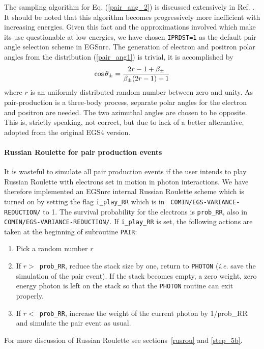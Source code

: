 The sampling algorithm for Eq. (\ref{pair_ang_2}) is discussed
extensively in Ref. \cite{Bi91}.
It should be noted that
this algorithm becomes progressively more inefficient with
increasing energies. Given this fact and the approximations
involved which make its use questionable at low energies,
we have chosen {\tt IPRDST=1} as the default
pair angle selection scheme in EGSnrc. The generation
of electron and positron polar angles from the
distribution (\ref{pair_ang1}) is trivial, it
is accomplished by
\begin{equation}
\cos \theta_\pm = {2 r - 1 + \beta_\pm \over \beta_\pm (2 r -1 ) + 1}
\end{equation}
where $r$ is an uniformly distributed random number between zero and
unity. As pair-production is a three-body process, separate polar
angles for the electron and positron are needed. The two
azimuthal angles are chosen to be opposite. This is,
strictly speaking, not correct, but due to lack of a better
alternative, adopted from the original EGS4 version.

\paragraph{Russian Roulette for pair production events} \hfill
{}

It is wasteful to simulate all pair production events if
the user intends to play Russian Roulette with electrons
set in motion in photon interactions. We have therefore implemented
an EGSnrc internal Russian Roulette scheme which is turned on
by setting the flag {\tt i\_play\_RR} which is in {\tt
COMIN/EGS-VARIANCE-REDUCTION/}
to 1. The survival probability for the electrons is
{\tt prob\_RR}, also in {\tt COMIN/EGS-VARIANCE-REDUCTION/}.
If {\tt i\_play\_RR} is set, the following actions are
taken at the beginning of subroutine {\tt PAIR}:
 
\begin{enumerate}
\item
Pick a random number $r$
\item
If $r > $~{\tt prob\_RR}, reduce the stack size by one, return
to {\tt PHOTON} ({\em i.e.} save the simulation of the pair event).
If the stack becomes empty, a zero weight, zero energy photon
is left on the stack so that the {\tt PHOTON} routine can exit
properly.
\item
If $r < $~{\tt prob\_RR}, increase the weight of the current photon by
1/prob\_RR and simulate the pair event as usual.
\end{enumerate}
For more discussion of Russian Roulette see sections~\ref{rusrou} and
\ref{step_5b}.

